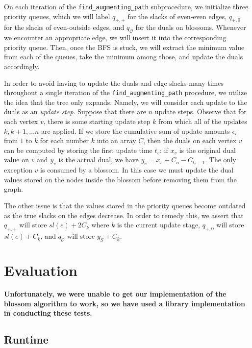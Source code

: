 \documentclass{article}
\begin{document}
On each iteration of the \texttt{find\_augmenting\_path} subprocedure, we initialize three priority queues, which we will label $q_{+, +}$ for the slacks of even-even edges, $q_{+, 0}$ for the slacks of even-outside edges, and $q_{\mathcal{O}}$ for the duals on blossoms. Whenever we encounter an appropriate edge, we will insert it into the corresponding priority queue. Then, once the BFS is stuck, we will extract the minimum value from each of the queues, take the minimum among those, and update the duals accordingly. 

In order to avoid having to update the duals and edge slacks many times throughout a single iteration of the \texttt{find\_augmenting\_path} procedure, we utilize the idea that the tree only expands. Namely, we will consider each update to the duals as an \textit{update step}. Suppose that there are $n$ update steps. Observe that for each vertex $v$, there is some starting update step $k$ from which all of the updates $k, k+ 1, \ldots n$ are applied. If we store the cumulative sum of update amounts $\epsilon_i$ from $1$ to $k$ for each number $k$ into an array $C$, then the duals on each vertex $v$ can be computed by storing the first update time $t_v$: if $x_v$ is the original dual value on $v$ and $y_v$ is the actual dual, we have $y_v = x_v + C_n - C_{t_v - 1}$. The only exception  $v$ is consumed by a blossom. In this case we must update the dual values stored on the nodes inside the blossom before removing them from the graph.

The other issue is that the values stored in the priority queues become outdated as the true slacks on the edges decrease. In order to remedy this, we assert that $q_{+, +}$ will store $sl(e) + 2 C_k$ where $k$ is the current update stage, $q_{+, 0}$ will store $sl(e) + C_k$, and $q_\mathcal{O}$ will store $y_S + C_k$. 

\section{Evaluation}

\textbf{Unfortunately, we were unable to get our implementation of the blossom algorithm to work, so we have used a library implementation in conducting these tests.}

\subsection{Runtime}
\end{document}
